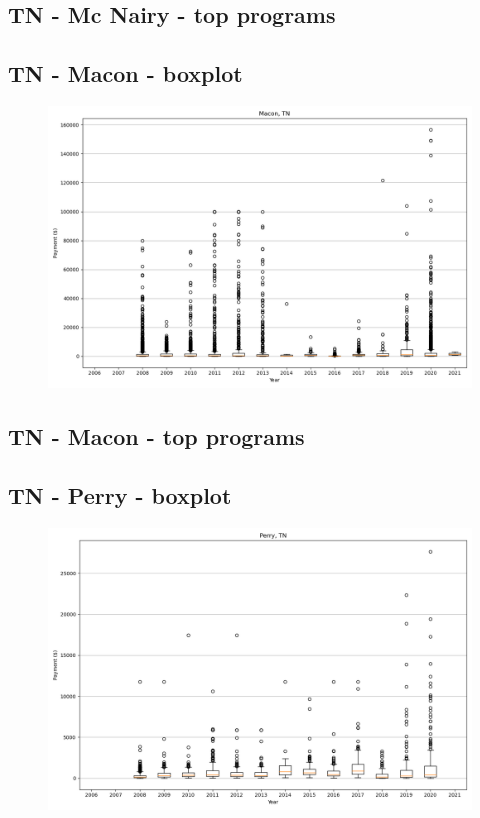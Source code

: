 \subsection*{TN - Mc Nairy - top programs}

\newpage
\subsection*{TN - Macon - boxplot}
\begin{figure}[h]
\centering
\includegraphics[width=7in]{../output/boxplots/counties/Macon-TN_boxplot.png}
\end{figure}


\subsection*{TN - Macon - top programs}

\newpage
\subsection*{TN - Perry - boxplot}
\begin{figure}[h]
\centering
\includegraphics[width=7in]{../output/boxplots/counties/Perry-TN_boxplot.png}
\end{figure}


